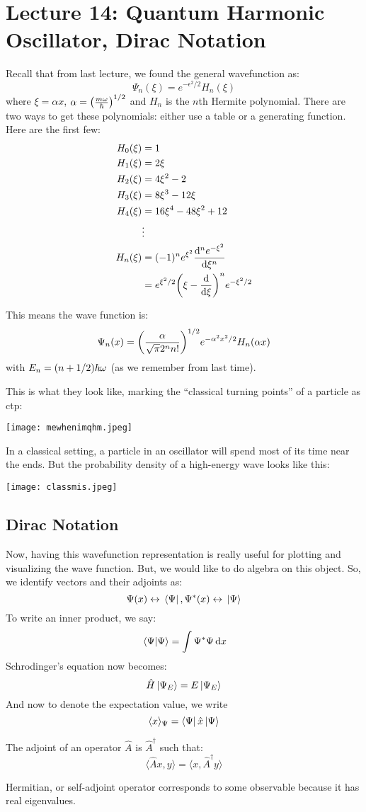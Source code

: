 \section{Lecture 14: Quantum Harmonic Oscillator, Dirac Notation}

Recall that from last lecture, we found the general wavefunction as:
\[ \Psi_n(\xi) = e^{-\epsilon^2/2} H_n(\xi) \]
where $\xi = \alpha x$, $\alpha = \qty(\frac{m\omega}{\hbar})^{1/2}$ and $H_n$ is the $n$th Hermite polynomial.
There are two ways to get these polynomials: either use a table or a generating function.
Here are the first few:
\begin{align*}
    H_0(\xi) &= 1 \\
    H_1(\xi) &= 2\xi \\
    H_2(\xi) &= 4\xi^2 - 2 \\
    H_3(\xi) &= 8\xi^3 - 12 \xi \\
    H_4(\xi) &= 16\xi^4 - 48\xi^2 + 12 \\
    &\vdots \\
    H_n(\xi) &= (-1)^n e^{\xi^2} \derivative{^n e^{-\xi^2}}{\xi^n} \\
    &= e^{\xi^2/2} \qty(\xi - \derivative{}{\xi})^n e^{-\xi^2/2}
\end{align*}

This means the wave function is:
\[ \Psi_n(x) = \qty(\frac{\alpha}{\sqrt{\pi} 2^n n!})^{1/2} e^{-\alpha^2 x^2/2} H_n(\alpha x) \]
with $E_n = \qty(n + 1/2) \hbar \omega$ (as we remember from last time).

This is what they look like, marking the ``classical turning points'' of a particle as ctp:

\texttt{[image: mewhenimqhm.jpeg]}

In a classical setting, a particle in an oscillator will spend most of its time near the ends. But
the probability density of a high-energy wave looks like this:

\texttt{[image: classmis.jpeg]}

\newpage
\subsection{Dirac Notation}
Now, having this wavefunction representation is really useful for plotting and visualizing the wave function.
But, we would like to do algebra on this object. So, we identify vectors and their
adjoints as:
\[ \Psi(x) \leftrightarrow \bra*{\Psi}, \Psi^*(x) \leftrightarrow \ket*{\Psi} \]
To write an inner product, we say:
\[ \braket*{\Psi}{\Psi} = \int \Psi^* \Psi \dd{x} \]
Schrodinger's equation now becomes:
\[ \hat{H} \ket*{\Psi_E} = E \ket*{\Psi_E} \]
And now to denote the expectation value, we write
\[ \langle x \rangle_{\Psi}  = \bra{\Psi}\hat{x}\ket*{\Psi}\]
\begin{definition}[Adjoint]
    The adjoint of an operator $\hat{A}$ is $\hat{A}^{\dagger}$ such that:
    \[ \langle \hat{A}x, y \rangle = \langle x, \hat{A}^{\dagger} y \rangle \]
\end{definition}
Hermitian, or self-adjoint operator corresponds to some observable
because it has real eigenvalues. 

